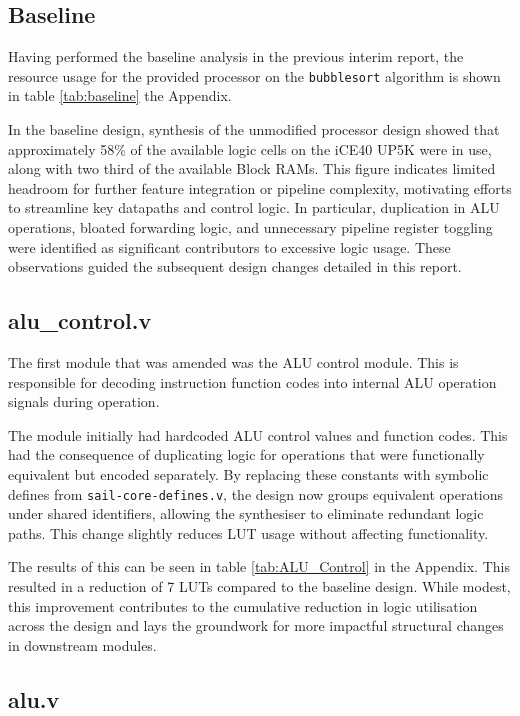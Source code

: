 \documentclass[a4paper,10pt]{article}
\begin{document}
\subsection{Baseline}
\label{sec:Baseline}

Having performed the baseline analysis in the previous interim report,
the resource usage for the provided processor on the \texttt{bubblesort}
algorithm is shown in table \ref{tab:baseline} the Appendix.

In the baseline design, 
synthesis of the unmodified processor design showed that approximately 
58\% of the available logic cells on the iCE40 UP5K were in use,
along with two third of the available Block RAMs. 
This figure indicates limited headroom for 
further feature integration or pipeline complexity, 
motivating efforts to streamline key datapaths and control logic. 
In particular, duplication in ALU operations, bloated forwarding logic, 
and unnecessary pipeline register toggling were identified 
as significant contributors to excessive logic usage. 
These observations guided the subsequent design changes detailed in this report.

\subsection{alu\_control.v}
\label{sec:alu_control.v}

The first module that was amended was the ALU control module.
This is responsible for decoding instruction function codes into internal
ALU operation signals during operation.

The module initially had hardcoded ALU control values and function codes.
This had the consequence of duplicating logic for operations 
that were functionally equivalent but encoded separately. 
By replacing these constants with symbolic defines from 
\texttt{sail-core-defines.v}, 
the design now groups equivalent operations under shared identifiers, 
allowing the synthesiser to eliminate redundant logic paths. 
This change slightly reduces LUT usage without affecting functionality.

The results of this can be seen in table 
\ref{tab:ALU_Control} in the Appendix.
This resulted in a reduction of 7 LUTs compared to the baseline design.
While modest, this improvement contributes to the cumulative reduction 
in logic utilisation across the design and 
lays the groundwork for more impactful structural changes in downstream modules.

\subsection{alu.v}
\label{sec:alu.v}
\end{document}
